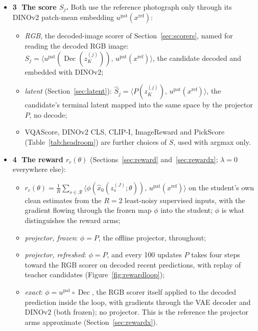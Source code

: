 \documentclass[11pt,a4paper]{article}
\DeclareMathOperator{\Dec}{Dec}
\begin{document}
\begin{itemize}
\begin{itemize}
  \end{itemize}
\item \textbf{\textcircled{3} The score $S_j$.} Both use the reference photograph only through its DINOv2 patch-mean embedding $u^{\mathrm{pat}}(x^{\mathrm{ref}})$:
  \begin{itemize}
  \item \emph{RGB}, the decoded-image scorer of Section~\ref{sec:scorers}, named for reading the decoded RGB image: $S_j=\big\langle u^{\mathrm{pat}}(\Dec(z_K^{(j)})),\,u^{\mathrm{pat}}(x^{\mathrm{ref}})\big\rangle$, the candidate decoded and embedded with DINOv2;
  \item \emph{latent} (Section~\ref{sec:latent}): $\hat S_j=\big\langle P(z_K^{(j)}),\,u^{\mathrm{pat}}(x^{\mathrm{ref}})\big\rangle$, the candidate's terminal latent mapped into the same space by the projector $P$, no decode;
  \item VQAScore, DINOv2 CLS, CLIP-I, ImageReward and PickScore (Table~\ref{tab:headroom}) are further choices of $S$, used with argmax only.
  \end{itemize}
\item \textbf{\textcircled{4} The reward $r_c(\theta)$} (Sections~\ref{sec:reward} and~\ref{sec:rewardx}; $\lambda=0$ everywhere else):
  \begin{itemize}
  \item $r_c(\theta)=\frac{1}{R}\sum_{s\in\mathcal{R}}\big\langle \phi(\hat{x}_0(z^{(J)}_s;\theta)),\,u^{\mathrm{pat}}(x^{\mathrm{ref}})\big\rangle$ on the student's own clean estimates from the $R=2$ least-noisy supervised inputs, with the gradient flowing through the frozen map $\phi$ into the student; $\phi$ is what distinguishes the reward arms;
  \item \emph{projector, frozen}: $\phi=P$, the offline projector, throughout;
  \item \emph{projector, refreshed}: $\phi=P$, and every 100 updates $P$ takes four steps toward the RGB scorer on decoded recent predictions, with replay of teacher candidates (Figure~\ref{fig:rewardloop});
  \item \emph{exact}: $\phi=u^{\mathrm{pat}}\circ\Dec$, the RGB scorer itself applied to the decoded prediction inside the loop, with gradients through the VAE decoder and DINOv2 (both frozen); no projector. This is the reference the projector arms approximate (Section~\ref{sec:rewardx}).
  \end{itemize}
\end{itemize}
\end{document}
